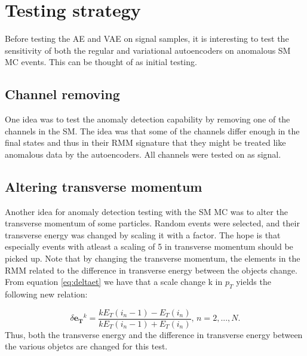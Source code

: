 \section*{Testing strategy}

Before testing the AE and VAE on signal samples, it is interesting to test the sensitivity of 
both the regular and variational autoencoders on anomalous SM MC events. This can be thought of as initial testing. 
\subsection*{Channel removing}
One idea was to test the anomaly detection capability by removing one of the channels in the SM.
The idea was that some of the channels differ enough in the final states and thus in their RMM signature that
they might be treated like anomalous data by the autoencoders. All channels were tested on as signal.
\subsection*{Altering transverse momentum}
Another idea for anomaly detection testing with the SM MC was to alter the transverse momentum of some particles. Random events were
selected, and their transverse energy was changed by scaling it with a factor. The hope is that especially events with atleast a scaling of 5 
in transverse momentum should be picked up. Note that by changing the transverse momentum, the elements in the RMM related to the difference in 
transverse energy between the objects change.
From equation \ref{eq:deltaet} we have that a scale change k in $p_T$ yields the following new relation:

\begin{equation}\label{eq:deltaet_scale}
    \delta\boldsymbol{e_T}^k = \frac{kE_T(i_n-1) - E_T(i_n)}{kE_T(i_n-1) + E_T(i_n)}, \, n = 2, ..., N.
\end{equation}
Thus, both the transverse energy and the difference in transverse energy between the various objetcs are changed for this test.


